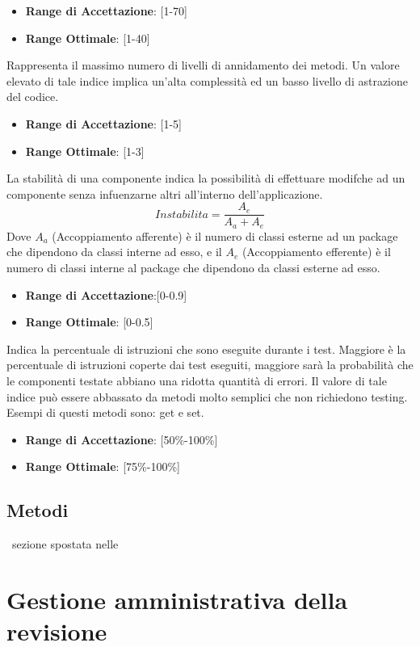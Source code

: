 \documentclass[12pt,a4paper]{article}
\begin{document}
\begin{itemize}
\item \textbf{Range di Accettazione}: [1-70]
\item \textbf{Range Ottimale}: [1-40]
\end{itemize}
Rappresenta il massimo numero di livelli di annidamento dei metodi. Un valore elevato di tale indice implica un’alta complessità ed un basso livello di astrazione del codice.
\begin{itemize}
\item \textbf{Range di Accettazione}: [1-5]
\item \textbf{Range Ottimale}: [1-3]
\end{itemize}
La stabilità di una componente indica la possibilità di effettuare modifche ad un componente senza infuenzarne altri all’interno dell'applicazione.
\[Instabilita=\frac{A_e}{A_a+A_e}\]
Dove $A_a$ (Accoppiamento afferente) è il numero di classi esterne ad un package che dipendono da classi interne ad esso, e il $A_e$ (Accoppiamento efferente) è il numero di classi interne al package che dipendono da classi esterne ad esso.
\begin{itemize}
\item \textbf{Range di Accettazione}:[0-0.9]
\item \textbf{Range Ottimale}: [0-0.5]
\end{itemize}
Indica la percentuale di istruzioni che sono eseguite durante i test. Maggiore è la percentuale di istruzioni coperte dai test eseguiti, maggiore sarà la probabilità che le componenti testate abbiano una ridotta quantità di errori. Il valore di tale indice può essere abbassato da metodi molto semplici che non richiedono testing. Esempi di questi metodi sono: get e set.
\begin{itemize}
\item \textbf{Range di Accettazione}: [50\%-100\%]
\item \textbf{Range Ottimale}: [75\%-100\%]
\end{itemize}
\subsection{Metodi}
\TODO \AVI\ sezione spostata nelle \NdP
\newpage
\section{Gestione amministrativa della revisione}
\end{document}

